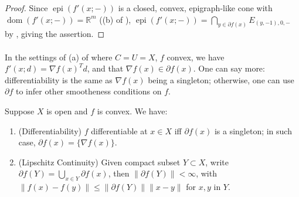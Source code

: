 \begin{proof}
	Since $\operatorname{epi}(f'(x;-))$ is a closed, convex, epigraph-like cone with $\operatorname{dom}(f'(x;-))=\mathbb{R}^m$ ((b) of ), $\operatorname{epi}(f'(x;-))=\bigcap_{y\in \partial f(x)}E_{(y,-1),0,-}$ by , giving the assertion.
\end{proof}

\paragraph{}In the settings of (a) of  where $C=U=X$, $f$ convex, we have $f'(x;d)= \nabla f(x)^Td$, and that $\nabla f(x)\in \partial f(x)$. One can say more: differentiability is the same as $\nabla f(x)$ being a singleton; otherwise, one can use $\partial f$ to infer other smootheness conditions on $f$.

\begin{prop}\label{prop:022-smoothness-and-other-stuffs}Suppose $X$ is open and $f$ is convex. We have:
	\begin{enumerate}[label=(\alph*)]
		\item (Differentiability) $f$ differentiable at $x\in X$ iff $\partial f(x)$ is a singleton; in such case, $\partial f(x)=\{\nabla f(x)\}$.
		\item (Lipschitz Continuity) Given compact subset $Y\subset X$, write $\partial f(Y)=\bigcup_{x\in Y}\partial f(x)$, then $\|\partial f(Y)\|<\infty$, with $\|f(x)-f(y)\|\leq \|\partial f(Y)\|\|x-y\|$ for $x,y$ in $Y$.
	\end{enumerate}
\end{prop}

